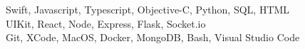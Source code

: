    Swift, Javascript, Typescript, Objective-C, Python, SQL, HTML \\
   UIKit, React, Node, Express, Flask, Socket.io\\
  Git, XCode, MacOS, Docker, MongoDB, Bash, Visual Studio Code
